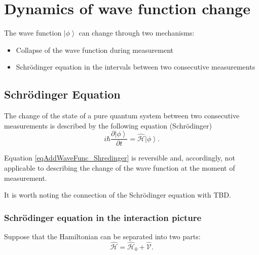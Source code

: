 \section{Dynamics of wave function change}
\label{AddWaveFunc}
The wave function $\left| \phi \right>$ can change through
two mechanisms:
\begin{itemize}
\item Collapse of the wave function during measurement
\item Schrödinger equation in the intervals between two consecutive
  measurements 
\end{itemize}

\subsection{Schrödinger Equation}
The change of the state of a pure quantum system between two
consecutive measurements is described by the following equation (Schrödinger)
\begin{equation}
i \hbar \frac{\partial \left| \phi \right>}{\partial t} = \hat{\mathcal{H}}
\left| \phi \right>.
\label{eqAddWaveFunc_Shredinger}
\end{equation}

Equation \eqref{eqAddWaveFunc_Shredinger} is reversible and,
accordingly, not applicable to describing the change of the wave function at
the moment of measurement.

It is worth noting the connection of the Schrödinger equation with 
 TBD.

\subsubsection{Schrödinger equation in the interaction picture}
\label{AddWaveFuncInter}
Suppose that the Hamiltonian can be separated into two parts:
\begin{equation}
\hat{\mathcal{H}} = \hat{\mathcal{H}}_0 + \hat{\mathcal{V}}.
\nonumber
\end{equation}

